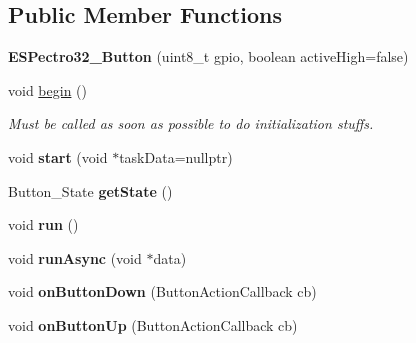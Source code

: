 \subsection*{Public Member Functions}
\begin{DoxyCompactItemize}
\item 
\hypertarget{classESPectro32__Button_a0e823e4ff38fa5a16858d8a0267169ed}{{\bfseries E\-S\-Pectro32\-\_\-\-Button} (uint8\-\_\-t gpio, boolean active\-High=false)}\label{classESPectro32__Button_a0e823e4ff38fa5a16858d8a0267169ed}

\item 
\hypertarget{classESPectro32__Button_a7055a1c1acfa459a1c81bd0b08681159}{void \hyperlink{classESPectro32__Button_a7055a1c1acfa459a1c81bd0b08681159}{begin} ()}\label{classESPectro32__Button_a7055a1c1acfa459a1c81bd0b08681159}

\begin{DoxyCompactList}\small\item\em Must be called as soon as possible to do initialization stuffs. \end{DoxyCompactList}\item 
\hypertarget{classESPectro32__Button_a9af097046592195c0778b98ba50022eb}{void {\bfseries start} (void $\ast$task\-Data=nullptr)}\label{classESPectro32__Button_a9af097046592195c0778b98ba50022eb}

\item 
\hypertarget{classESPectro32__Button_a8706dbe3931f2e60de36a667e451ad2c}{Button\-\_\-\-State {\bfseries get\-State} ()}\label{classESPectro32__Button_a8706dbe3931f2e60de36a667e451ad2c}

\item 
\hypertarget{classESPectro32__Button_a62289ae77d95dbc54dfcadd84adb95a8}{void {\bfseries run} ()}\label{classESPectro32__Button_a62289ae77d95dbc54dfcadd84adb95a8}

\item 
\hypertarget{classESPectro32__Button_a7c07861f069f7af51a4a9e29b8bcdbdf}{void {\bfseries run\-Async} (void $\ast$data)}\label{classESPectro32__Button_a7c07861f069f7af51a4a9e29b8bcdbdf}

\item 
\hypertarget{classESPectro32__Button_a62b9b6106ef44eefd820ec79bcf410ed}{void {\bfseries on\-Button\-Down} (Button\-Action\-Callback cb)}\label{classESPectro32__Button_a62b9b6106ef44eefd820ec79bcf410ed}

\item 
\hypertarget{classESPectro32__Button_ab0d4b247a9964a4e0be84c7e1f820aaa}{void {\bfseries on\-Button\-Up} (Button\-Action\-Callback cb)}\label{classESPectro32__Button_ab0d4b247a9964a4e0be84c7e1f820aaa}


\end{DoxyCompactItemize}
